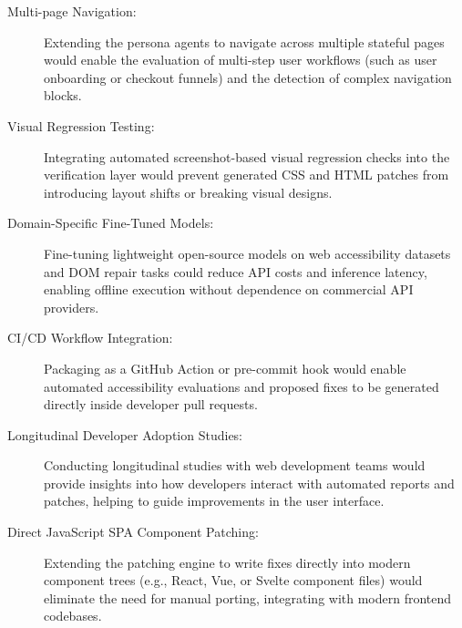 \begin{description}
  \item[Multi-page Navigation:] Extending the persona agents to navigate across multiple stateful pages would enable the evaluation of multi-step user workflows (such as user onboarding or checkout funnels) and the detection of complex navigation blocks.
  \item[Visual Regression Testing:] Integrating automated screenshot-based visual regression checks into the verification layer would prevent generated CSS and HTML patches from introducing layout shifts or breaking visual designs.
  \item[Domain-Specific Fine-Tuned Models:] Fine-tuning lightweight open-source models on web accessibility datasets and DOM repair tasks could reduce API costs and inference latency, enabling offline execution without dependence on commercial API providers.
  \item[CI/CD Workflow Integration:] Packaging \versimux{} as a GitHub Action or pre-commit hook would enable automated accessibility evaluations and proposed fixes to be generated directly inside developer pull requests.
  \item[Longitudinal Developer Adoption Studies:] Conducting longitudinal studies with web development teams would provide insights into how developers interact with automated reports and patches, helping to guide improvements in the user interface.
  \item[Direct JavaScript SPA Component Patching:] Extending the patching engine to write fixes directly into modern component trees (e.g., React, Vue, or Svelte component files) would eliminate the need for manual porting, integrating with modern frontend codebases.
\end{description}
